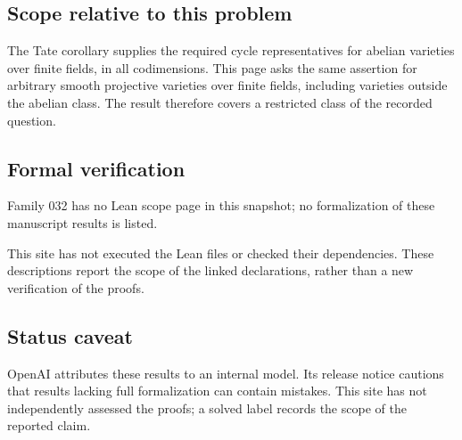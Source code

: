 \documentclass[11pt]{article}
\begin{document}
\subsection{Scope relative to this problem}
The Tate corollary supplies the required cycle representatives for abelian varieties over finite fields, in all codimensions. This page asks the same assertion for arbitrary smooth projective varieties over finite fields, including varieties outside the abelian class. The result therefore covers a restricted class of the recorded question.

\subsection{Formal verification}
Family 032 has no Lean scope page in this snapshot; no formalization of these manuscript results is listed.

This site has not executed the Lean files or checked their dependencies. These descriptions report the scope of the linked declarations, rather than a new verification of the proofs.

\subsection{Status caveat}
OpenAI attributes these results to an internal model. Its release notice cautions that results lacking full formalization can contain mistakes. This site has not independently assessed the proofs; a solved label records the scope of the reported claim.
\end{document}
